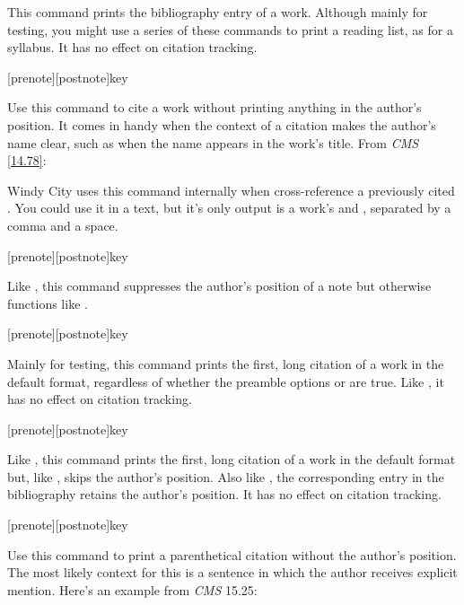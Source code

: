 \documentclass[11pt,letterpaper,oneside]{article}
\begin{document}
\begin{ltxsyntax}


This command prints the bibliography entry of a work. Although mainly
for testing, you might use a series of these commands to print a
reading list, as for a syllabus. It has no effect on citation
tracking.

[prenote][postnote]{key}

Use this command to cite a work without printing anything in the
author's position. It comes in handy when the context of a citation
makes the author's name clear, such as when the name appears in the
work's title. From \textit{CMS} \ref{14.78}:

\begin{citebib}
\item \cite*[233]{franklin1868}
\item \cite*[234]{franklin1868}
\end{citebib}


Windy City uses this command internally when cross-reference a
previously cited . You could use it in a text, but
it's only output is a work's  and
, separated by a comma and a space.

[prenote][postnote]{key}

Like , this command suppresses the author's position of a
note but otherwise functions like .

[prenote][postnote]{key}

Mainly for testing, this command prints the first, long citation of a
work in the default format, regardless of whether the preamble options
 or  are true. Like , it has
no effect on citation tracking.

[prenote][postnote]{key}

Like , this command prints the first, long citation of a
work in the default format but, like , skips the author's
position. Also like , the corresponding entry in the
bibliography retains the author's position. It has no effect on
citation tracking.

[prenote][postnote]{key}

Use this command to print a parenthetical citation without the
author's position. The most likely context for this is a sentence in
which the author receives explicit mention. Here's an example from
\textit{CMS} 15.25:


\end{ltxsyntax}
\end{document}

